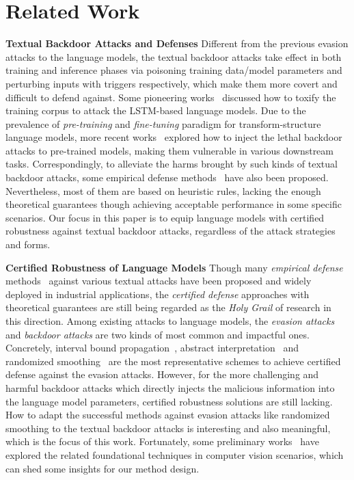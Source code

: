 \section{Related Work}
\textbf{Textual Backdoor Attacks and Defenses}
Different from the previous evasion attacks to the language models, the textual backdoor attacks take effect in both training and inference phases via poisoning training data/model parameters and perturbing inputs with triggers respectively, which make them more covert and difficult to defend against. Some pioneering works~\citep{dai2019backdoor, chen2021mitigating} discussed how to toxify the training corpus to attack the LSTM-based language models. Due to the prevalence of \textit{pre-training} and \textit{fine-tuning} paradigm for transform-structure language models, more recent works~\citep{zhao2023prompt,chen2021badpre,chen2021badnl,shen2021backdoor,yang2021careful,li2021backdoor,zhang2021trojaning,guo2022threats,qi2021hidden,qi2021turn} explored how to inject the lethal backdoor attacks to pre-trained models, making them vulnerable in various downstream tasks. Correspondingly, to alleviate the harms brought by such kinds of textual backdoor attacks, some empirical defense methods~\citep{qi2021hidden,qi2021turn,qi2021onion} have also been proposed. Nevertheless, most of them are based on heuristic rules, lacking the enough theoretical guarantees though achieving acceptable performance in some specific scenarios. Our focus in this paper is to equip language models with certified robustness against textual backdoor attacks, regardless of the attack strategies and forms.

\textbf{Certified Robustness of Language Models}
Though many \textit{empirical defense} methods~\citep{qi2021onion, cui2022unified, yan2023bite} against various textual attacks have been proposed and widely deployed in industrial applications, the \textit{certified defense} approaches with theoretical guarantees are still being regarded as the \textit{Holy Grail} of research in this direction. Among existing attacks to language models, the \textit{evasion attacks} and \textit{backdoor attacks} are two kinds of most common and impactful ones. Concretely, interval bound propagation~\citep{jia2019certified, huang2019achieving, ye2020safer, wang2023robustness}, abstract interpretation~\citep{bonaert2021fast, du2021cert} and randomized smoothing~\citep{zhang2023certified, zhao2022certified, zengcertified, wang2021certified, cohen2019certified, ji2024advancing, zhang2024random, lou2024cr} are the most representative schemes to achieve certified defense against the evasion attacks. However, for the more challenging and harmful backdoor attacks which directly injects the malicious information into the language model parameters, certified robustness solutions are still lacking. How to adapt the successful methods against evasion attacks like randomized smoothing to the textual backdoor attacks is interesting and also meaningful, which is the focus of this work. Fortunately, some preliminary works~\citep{wang2020certifying, xie2021crfl, weber2023rab} have explored the related foundational techniques in computer vision scenarios, which can shed some insights for our method design.